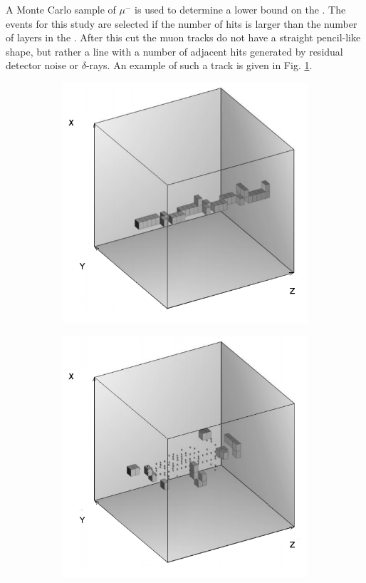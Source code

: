 A Monte Carlo sample of $\mu^-$ is used to determine a lower bound on the \ep. The events for this study are selected if the number of hits is larger than the number of layers in the \ecalp. After this cut the muon tracks do not have a straight pencil-like shape, but rather a line with a number of adjacent hits generated by residual detector noise or $\delta$-rays. An example of such a track is given in Fig. \ref{fig:muonsys}.
\begin{figure}[H]
	\centering
	\begin{subfigure}{0.5\textwidth}
		\centering
		\includegraphics[width=.90\linewidth]{ECAL/graphics/muon-sys.png}
		\caption{\label{fig:muonsys}}
	\end{subfigure}%
	\begin{subfigure}{0.5\textwidth}
		\centering
		\includegraphics[width=.90\linewidth]{ECAL/graphics/e-sys.png}

\end{subfigure}
\end{figure}
